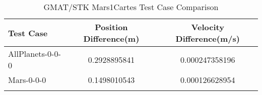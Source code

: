\begin{table}[htbp!]
\centering
\caption{ GMAT/STK Mars1Cartes Test Case Comparison}
      \begin{tabular}{lcc}
      \hline\hline
          Test Case & Position Difference(m) & Velocity Difference(m/s) \\
         \hline
         AllPlanets-0-0-0 & 0.2928895841 & 0.000247358196 \\
         Mars-0-0-0 & 0.1498010543 & 0.000126628954 \\
      \hline\hline
      \label{Table: Mars1CartesTable} 
\end{tabular}
\end{table}
